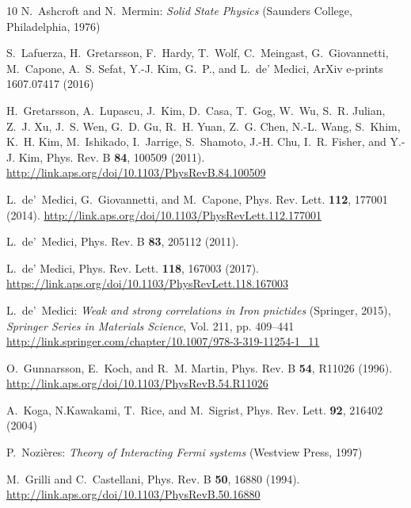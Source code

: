 \documentclass[12pt,twoside]{article}
\begin{document}
\begin{thebibliography}{10}
N.~Ashcroft and N.~Mermin: \emph{{Solid State Physics}} (Saunders College,
  Philadelphia, 1976)

S.~Lafuerza, H.~Gretarsson, F.~Hardy, T.~Wolf, C.~Meingast, G.~Giovannetti,
  M.~Capone, A.~S. Sefat, Y.-J. Kim, G.~P., and L.~{de' Medici}, ArXiv e-prints
  1607.07417  (2016)

H.~Gretarsson, A.~Lupascu, J.~Kim, D.~Casa, T.~Gog, W.~Wu, S.~R. Julian, Z.~J.
  Xu, J.~S. Wen, G.~D. Gu, R.~H. Yuan, Z.~G. Chen, N.-L. Wang, S.~Khim, K.~H.
  Kim, M.~Ishikado, I.~Jarrige, S.~Shamoto, J.-H. Chu, I.~R. Fisher, and Y.-J.
  Kim, Phys. Rev. B \textbf{84}, 100509 (2011).
\newblock {}
\newline\urlprefix\url{http://link.aps.org/doi/10.1103/PhysRevB.84.100509}

L.~{de'~Medici}, G.~Giovannetti, and M.~Capone, Phys. Rev. Lett. \textbf{112},
  177001 (2014).
\newblock {}
\newline\urlprefix\url{http://link.aps.org/doi/10.1103/PhysRevLett.112.177001}

L.~{de'~Medici}, Phys. Rev. B \textbf{83}, 205112 (2011).
\newblock {}

L.~de' Medici, Phys. Rev. Lett. \textbf{118}, 167003 (2017).
\newblock {}
\newline\urlprefix\url{https://link.aps.org/doi/10.1103/PhysRevLett.118.167003}

L.~{de'~Medici}: \emph{Weak {\it and} strong correlations in Iron pnictides}
  (Springer, 2015), \emph{Springer Series in Materials Science}, Vol. 211, pp.
  409--441
\newline\urlprefix\url{http://link.springer.com/chapter/10.1007/978-3-319-11254-1_11}

O.~Gunnarsson, E.~Koch, and R.~M. Martin, Phys. Rev. B \textbf{54}, R11026
  (1996).
\newblock {}
\newline\urlprefix\url{http://link.aps.org/doi/10.1103/PhysRevB.54.R11026}

A.~Koga, N.Kawakami, T.~Rice, and M.~Sigrist, Phys. Rev. Lett. \textbf{92},
  216402 (2004)

P.~Nozi{\`e}res: \emph{Theory of {I}nteracting {F}ermi systems} (Westview
  Press, 1997)

M.~Grilli and C.~Castellani, Phys. Rev. B \textbf{50}, 16880 (1994).
\newblock {}
\newline\urlprefix\url{http://link.aps.org/doi/10.1103/PhysRevB.50.16880}

\end{thebibliography}


\clearchapter
\end{document}
